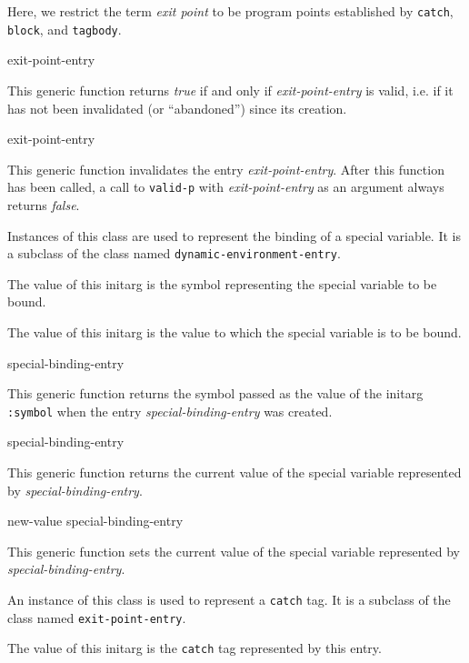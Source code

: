 Here, we restrict the term \emph{exit point} to be program points
established by \texttt{catch}, \texttt{block}, and \texttt{tagbody}.

 {exit-point-entry}

This generic function returns \textit{true} if and only if
\textit{exit-point-entry} is valid, i.e. if it has not been invalidated (or
``abandoned'') since its creation.

 {exit-point-entry}

This generic function invalidates the entry \textit{exit-point-entry}.
After this function has been called, a call to \texttt{valid-p} with
\textit{exit-point-entry} as an argument always returns \textit{false}.


Instances of this class are used to represent the binding of a special
variable.  It is a subclass of the class named
\texttt{dynamic-environment-entry}.


The value of this initarg is the symbol representing the special
variable to be bound.


The value of this initarg is the value to which the special variable
is to be bound.

 {special-binding-entry}

This generic function returns the symbol passed as the value of the
initarg \texttt{:symbol} when the entry \textit{special-binding-entry}
was created.

 {special-binding-entry}

This generic function returns the current value of the special
variable represented by \textit{special-binding-entry}.

 {new-value special-binding-entry}

This generic function sets the current value of the special
variable represented by \textit{special-binding-entry}.


An instance of this class is used to represent a \texttt{catch} tag.
It is a subclass of the class named \texttt{exit-point-entry}.


The value of this initarg is the \texttt{catch} tag represented by
this entry.

